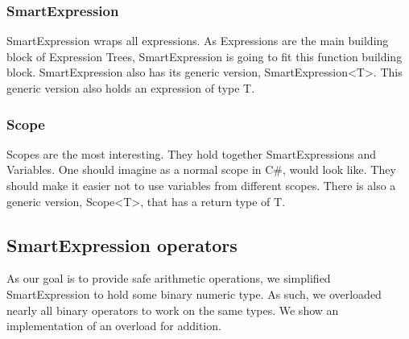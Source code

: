 \subsubsection{SmartExpression}
SmartExpression wraps all expressions. As Expressions are the main building block of Expression Trees, SmartExpression is going to fit this function building block. SmartExpression also has its generic version, SmartExpression<T>. This generic version also holds an expression of type T. 


\subsubsection{Scope}
Scopes are the most interesting. They hold together SmartExpressions and Variables. One should imagine as a normal scope in C\#, would look like. They should make it easier not to use variables from different scopes. There is also a generic version, Scope<T>, that has a return type of T. 


\subsection{SmartExpression operators}
As our goal is to provide safe arithmetic operations, we simplified SmartExpression to hold some binary numeric type. As such, we overloaded nearly all binary operators to work on the same types. We show an implementation of an overload for addition.

